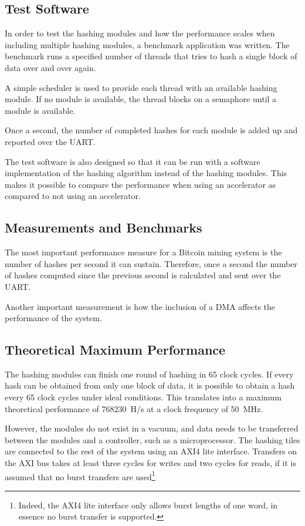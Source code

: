 \subsection{Test Software}
In order to test the hashing modules and how the performance scales when including
multiple hashing modules, a benchmark application was written. The benchmark
runs a specified number of threads that tries to hash a single block of data
over and over again.

A simple scheduler is used to provide each thread with an available hashing module.
If no module is available, the thread blocks on a semaphore until a module is available.

Once a second, the number of completed hashes for each module is added up and
reported over the UART.

The test software is also designed so that it can be run with a software implementation
of the hashing algorithm instead of the hashing modules. This makes it possible
to compare the performance when using an accelerator as compared to not using
an accelerator.

\subsection{Measurements and Benchmarks}
The most important performance measure for a Bitcoin mining system is the number
of hashes per second it can sustain. Therefore, once a second the number of hashes
computed since the previous second is calculated and sent over the UART.

Another important measurement is how the inclusion of a DMA affects the performance
of the system.

\subsection{Theoretical Maximum Performance} %

The hashing modules can finish one round of hashing in 65 clock cycles. If
every hash can be obtained from only one block of data, it is possible to
obtain a hash every 65 clock cycles under ideal conditions. This translates
into a maximum theoretical performance of 768230~H/s at a clock frequency of
50~MHz.

However, the modules do not exist in a vacuum, and data needs to be transferred
between the modules and a controller, such as a microprocessor. The hashing tiles
are connected to the rest of the system using an AXI4 lite interface. Transfers
on the AXI bus takes at least three cycles for writes and two cycles for reads,
if it is assumed that no burst transfers are used\footnote{Indeed, the AXI4 lite
interface only allows burst lengths of one word, in essence no burst transfer is
supported.}

